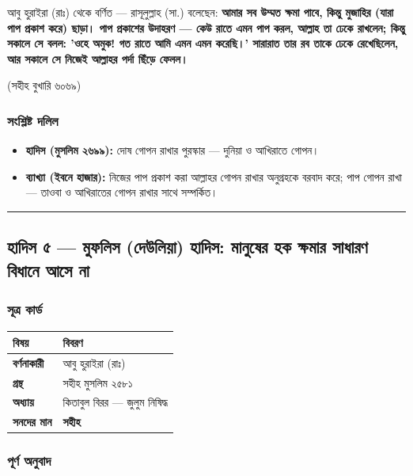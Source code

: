 আবু হুরাইরা (রাঃ) থেকে বর্ণিত — রাসূলুল্লাহ (সা.) বলেছেন: \textbf{আমার সব উম্মত ক্ষমা পাবে, কিন্তু মুজাহির (যারা পাপ প্রকাশ করে) ছাড়া। পাপ প্রকাশের উদাহরণ — কেউ রাতে এমন পাপ করল, আল্লাহ তা ঢেকে রাখলেন; কিন্তু সকালে সে বলল: 'ওহে অমুক! গত রাতে আমি এমন এমন করেছি।' সারারাত তার রব তাকে ঢেকে রেখেছিলেন, আর সকালে সে নিজেই আল্লাহর পর্দা ছিঁড়ে ফেলল।}

(সহীহ বুখারি ৬০৬৯)

\subsubsection*{সংশ্লিষ্ট দলিল}

\begin{itemize}
\item \textbf{হাদিস (মুসলিম ২৬৯৯):} দোষ গোপন রাখার পুরস্কার — দুনিয়া ও আখিরাতে গোপন।
\item \textbf{ব্যাখ্যা (ইবনে হাজার):} নিজের পাপ প্রকাশ করা আল্লাহর গোপন রাখার অনুগ্রহকে বরবাদ করে; পাপ গোপন রাখা — তাওবা ও আখিরাতের গোপন রাখার সাথে সম্পর্কিত।
\end{itemize}
\medskip\hrule\medskip

\subsection*{হাদিস ৫ — মুফলিস (দেউলিয়া) হাদিস: মানুষের হক ক্ষমার সাধারণ বিধানে আসে না}

\subsubsection*{সূত্র কার্ড}

\begin{table}[h]\centering\small
\begin{tabular}{ll}
বিষয় & বিবরণ \\
\hline
\textbf{বর্ণনাকারী} & আবু হুরাইরা (রাঃ) \\
\textbf{গ্রন্থ} & সহীহ মুসলিম ২৫৮১ \\
\textbf{অধ্যায়} & কিতাবুল বিরর — \lat{“}জুলুম নিষিদ্ধ\lat{”} \\
\textbf{সনদের মান} & \textbf{সহীহ} \\
\hline
\end{tabular}
\end{table}

\subsubsection*{পূর্ণ অনুবাদ}

